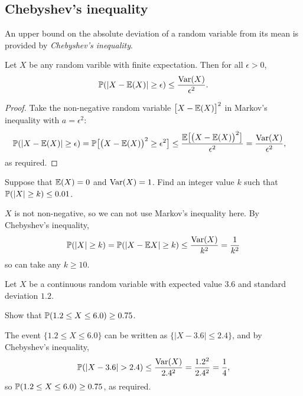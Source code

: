 \subsection{Chebyshev's inequality}

An upper bound on the absolute deviation of a random variable from its mean is provided by \emph{Chebyshev's inequality}.

\begin{corollary}
Let $X$ be any random varible with finite expectation. Then for all $\epsilon>0$,
\[
\mathbb{P}(|X-\mathbb{E}(X)|\geq \epsilon) \leq \frac{\text{Var}(X)}{\epsilon^2}.
\]
\end{corollary}
\begin{proof}
Take the non-negative random variable $\big[X-\mathbb{E}(X)\big]^2$ in Markov's inequality with $a=\epsilon^2$:
\begin{align*}
\mathbb{P}(|X-\mathbb{E}(X)|\geq \epsilon) 
	& = \mathbb{P}\big[\big(X-\mathbb{E}(X)\big)^2\geq \epsilon^2\big] 
	\leq	\frac{\mathbb{E}\big[\big(X-\mathbb{E}(X)\big)^2\big]}{\epsilon^2} 
	= \frac{\text{Var}(X)}{\epsilon^2},
\end{align*}	
as required.
\end{proof}

\begin{example}
Suppose that $\mathbb{E}(X) = 0$ and $\text{Var}(X) = 1$. Find an integer value $k$ such that $\mathbb{P}(|X|\geq k) \leq 0.01$.
\begin{solution}
$X$ is not non-negative, so we can not use Markov's inequality here. By Chebyshev's inequality,
\[
\prob(|X|\geq k) = \prob(|X-\expe X|\geq k) \leq \frac{\var(X)}{k^2} = \frac{1}{k^2} %
\]
so can take any $k\geq 10$.
\end{solution}
\end{example}

\begin{example}
Let $X$ be a continuous random variable with expected value $3.6$ and standard deviation $1.2$. 
\par Show that $\mathbb{P}(1.2\leq X\leq 6.0) \geq 0.75$.
\begin{solution} %
\par
The event $\{1.2 \leq X \leq 6.0\}$ can be written as $\{|X-3.6| \leq 2.4\}$, and by Chebyshev's inequality,
\[
\prob(|X-3.6|> 2.4) \leq \frac{\var(X)}{2.4^2} = \frac{1.2^2}{2.4^2} = \frac{1}{4},
\]
so $\mathbb{P}(1.2 \leq X \leq 6.0) \geq 0.75$, as required.
\end{solution}
\end{example}



